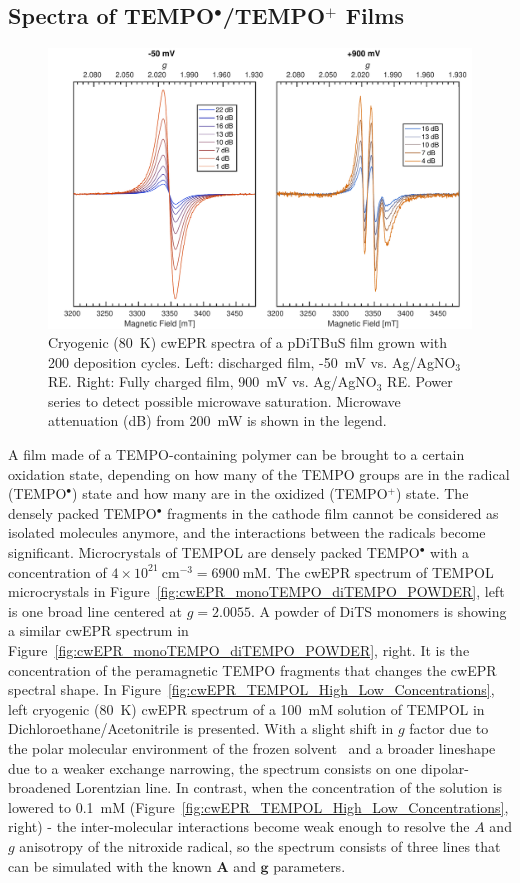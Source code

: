 \subsection{Spectra of TEMPO$^{\bullet}$/TEMPO$^{+}$ Films}
\begin{figure}[H]
\center
	\includegraphics[width=1\textwidth]{./operando_epr/figures/CRYO/S220104_CW.pdf}
	\caption{Cryogenic (80~K) cwEPR spectra of a pDiTBuS film grown with 200 deposition cycles. Left: discharged film, -50~mV vs. Ag/AgNO$_3$ RE. Right: Fully charged film, 900~mV vs. Ag/AgNO$_3$ RE. Power series to detect possible microwave saturation. Microwave attenuation (dB) from 200~mW is shown in the legend.}
	\label{fig:cwEPR_CRYO_DiTBuS_DCG_vs_CHG}
\end{figure}
A film made of a TEMPO-containing polymer can be brought to a certain oxidation state, depending on how many of the TEMPO groups are in the radical (TEMPO$^{\bullet}$) state and how many are in the oxidized (TEMPO$^{+}$) state. The densely packed TEMPO$^{\bullet}$ fragments in the cathode film cannot be considered as isolated molecules anymore, and the interactions between the radicals become significant. Microcrystals of TEMPOL are densely packed TEMPO$^{\bullet}$ with a concentration of $4\times10^{21}~$cm$^{-3}=6900~$mM. The cwEPR spectrum of TEMPOL microcrystals in Figure~\ref{fig:cwEPR_monoTEMPO_diTEMPO_POWDER}, left is one broad line centered at $g=2.0055$. A powder of DiTS monomers is showing a similar cwEPR spectrum in Figure~\ref{fig:cwEPR_monoTEMPO_diTEMPO_POWDER}, right. It is the concentration of the peramagnetic TEMPO fragments that changes the cwEPR spectral shape. In Figure~\ref{fig:cwEPR_TEMPOL_High_Low_Concentrations}, left cryogenic (80~K) cwEPR spectrum of a 100~mM solution of TEMPOL in Dichloroethane/Acetonitrile is presented. With a slight shift in $g$ factor due to the polar molecular environment of the frozen solvent~\cite{Siavash} and a broader lineshape due to a weaker exchange narrowing, the spectrum consists on one dipolar-broadened Lorentzian line. In contrast, when the concentration of the solution is lowered to 0.1~mM (Figure~\ref{fig:cwEPR_TEMPOL_High_Low_Concentrations}, right) - the inter-molecular interactions become weak enough to resolve the $A$ and $g$ anisotropy of the nitroxide radical, so the spectrum consists of three lines that can be simulated with the known $\textbf{A}$ and $\textbf{g}$ parameters.\\
